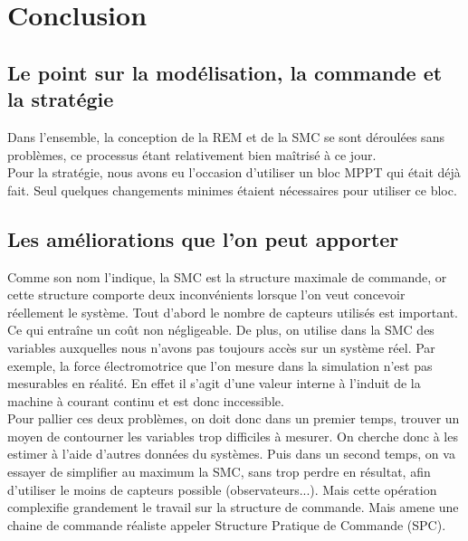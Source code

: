\section{Conclusion}

\subsection{Le point sur la modélisation, la commande et la stratégie}

Dans l'ensemble, la conception de la REM et de la SMC se sont déroulées sans problèmes, ce processus étant relativement bien maîtrisé à ce jour. \\
Pour la stratégie, nous avons eu l'occasion d'utiliser un bloc MPPT qui était déjà fait. Seul quelques changements minimes étaient nécessaires pour utiliser ce bloc. 
 

\subsection{Les améliorations que l'on peut apporter}

Comme son nom l'indique, la SMC est la structure maximale de commande, or cette structure comporte deux inconvénients lorsque l'on veut concevoir réellement le système. Tout d'abord le nombre de capteurs utilisés est important. Ce qui entraîne un coût non négligeable. De plus, on utilise dans la SMC des variables auxquelles nous n'avons pas toujours accès sur un système réel. Par exemple, la force électromotrice que l'on mesure dans la simulation n'est pas mesurables en réalité. En effet il s'agit d'une valeur interne à l'induit de la machine à courant continu et est donc inccessible. \\

Pour pallier ces deux problèmes, on doit donc dans un premier temps, trouver un moyen de contourner les variables trop difficiles à mesurer. On cherche donc à les estimer à l'aide d'autres données du systèmes. Puis dans un second temps, on va essayer de simplifier au maximum la SMC, sans trop perdre en résultat, afin d'utiliser le moins de capteurs possible (observateurs...). Mais cette opération complexifie grandement le travail sur la structure de commande. Mais amene une chaine de commande réaliste appeler Structure Pratique de Commande (SPC). \\